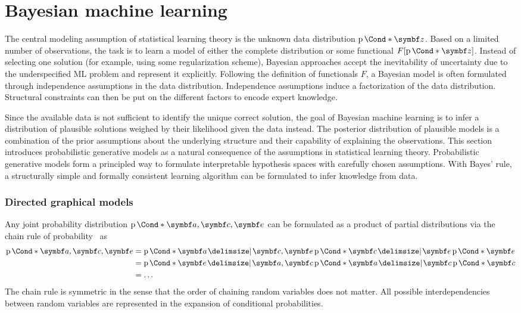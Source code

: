 \section{Bayesian machine learning}
\label{toc:bayesian_ml:bayesian_ml}
The central modeling assumption of statistical learning theory is the unknown data distribution $\Prob*{\mat{z}}$.
Based on a limited number of observations, the task is to learn a model of either the complete distribution or some functional $F[\Prob*{\mat{z}}]$.
Instead of selecting one solution (for example, using some regularization scheme), Bayesian approaches accept the inevitability of uncertainty due to the underspecified ML problem and represent it explicitly.
Following the definition of functionals $F$, a Bayesian model is often formulated through independence assumptions in the data distribution.
Independence assumptions induce a factorization of the data distribution.
Structural constraints can then be put on the different factors to encode expert knowledge.

Since the available data is not sufficient to identify the unique correct solution, the goal of Bayesian machine learning is to infer a distribution of plausible solutions weighed by their likelihood given the data instead.
The posterior distribution of plausible models is a combination of the prior assumptions about the underlying structure and their capability of explaining the observations.
This section introduces probabilistic generative models as a natural consequence of the assumptions in statistical learning theory.
Probabilistic generative models form a principled way to formulate interpretable hypothesis spaces with carefully chosen assumptions.
With Bayes' rule, a structurally simple and formally consistent learning algorithm can be formulated to infer knowledge from data.

\subsubsection{Directed graphical models}
Any joint probability distribution $\Prob*{\mat{a}, \mat{c}, \mat{e}}$ can be formulated as a product of partial distributions via the chain rule of probability~\parencite{murphy_machine_2012} as
\begin{equation}
    \begin{split}
        \Prob*{\mat{a}, \mat{c}, \mat{e}}
        &= \Prob*{\mat{a} \given \mat{c}, \mat{e}}\Prob*{\mat{c} \given \mat{e}}\Prob*{\mat{e}} \\
        &= \Prob*{\mat{e} \given \mat{a}, \mat{c}}\Prob*{\mat{a} \given \mat{c}}\Prob*{\mat{c}} \\
        &= \dots
    \end{split}
\end{equation}
The chain rule is symmetric in the sense that the order of chaining random variables does not matter.
All possible interdependencies between random variables are represented in the expansion of conditional probabilities.

